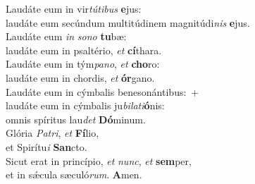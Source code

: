 \evenverse Laudáte eum in vir\textit{tú}\textit{ti}\textit{bus} \textbf{e}jus:~\*\\
\evenverse laudáte eum secúndum multitúdinem magnitúdi\textit{nis} \textbf{e}jus.\\
\oddverse Laudáte eum \textit{in} \textit{so}\textit{no} \textbf{tu}bæ:~\*\\
\oddverse laudáte eum in psaltério, \textit{et} \textbf{cí}thara.\\
\evenverse Laudáte eum in tým\textit{pa}\textit{no}, \textit{et} \textbf{cho}ro:~\*\\
\evenverse laudáte eum in chordis, \textit{et} \textbf{ór}gano.\\
\oddverse Laudáte eum in cýmbalis benesonántibus:~+\\
\oddverse  laudáte eum in cýmbalis ju\textit{bi}\textit{la}\textit{ti}\textbf{ó}nis:~\*\\
\oddverse omnis spíritus lau\textit{det} \textbf{Dó}minum.\\
\evenverse Glória \textit{Pa}\textit{tri}, \textit{et} \textbf{Fí}lio,~\*\\
\evenverse et Spirítu\textit{i} \textbf{San}cto.\\
\oddverse Sicut erat in princípio, \textit{et} \textit{nunc}, \textit{et} \textbf{sem}per,~\*\\
\oddverse et in sǽcula sæculó\textit{rum}. \textbf{A}men.\\

